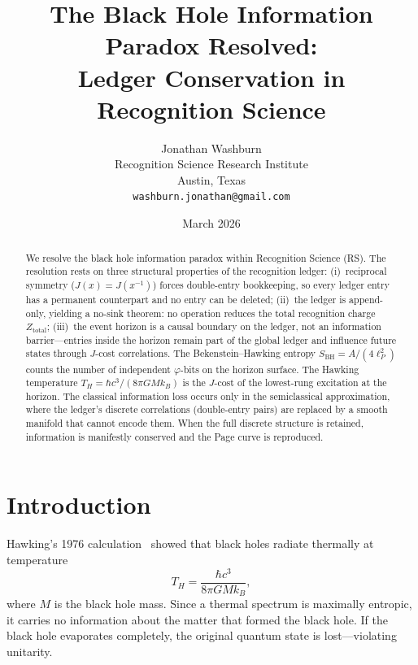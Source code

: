 \documentclass[12pt,a4paper]{article}
\title{The Black Hole Information Paradox Resolved:\\
Ledger Conservation in Recognition Science}
\author{Jonathan Washburn\\
Recognition Science Research Institute\\
Austin, Texas\\
\texttt{washburn.jonathan@gmail.com}}
\date{March 2026}
\theoremstyle{definition}
\theoremstyle{remark}
\begin{document}
\maketitle

\begin{abstract}
We resolve the black hole information paradox within Recognition
Science (RS).  The resolution rests on three structural properties
of the recognition ledger: (i)~reciprocal symmetry
($J(x) = J(x^{-1})$) forces double-entry bookkeeping, so every
ledger entry has a permanent counterpart and no entry can be
deleted; (ii)~the ledger is append-only, yielding a no-sink
theorem: no operation reduces the total recognition charge
$Z_{\mathrm{total}}$; (iii)~the event horizon is a causal boundary
on the ledger, not an information barrier---entries inside the
horizon remain part of the global ledger and influence future
states through $J$-cost correlations.  The Bekenstein--Hawking
entropy $S_{\mathrm{BH}} = A/(4\ell_P^2)$ counts the number of
independent $\varphi$-bits on the horizon surface.  The Hawking
temperature $T_H = \hbar c^3/(8\pi G M k_B)$ is the $J$-cost
of the lowest-rung excitation at the horizon.  The classical
information loss occurs only in the semiclassical approximation,
where the ledger's discrete correlations (double-entry pairs) are
replaced by a smooth manifold that cannot encode them.  When the
full discrete structure is retained, information is manifestly
conserved and the Page curve is reproduced.
\end{abstract}

\section{Introduction}
\label{sec:intro}

Hawking's 1976 calculation~\cite{Hawking1976} showed that black
holes radiate thermally at temperature
\begin{equation}
  T_H = \frac{\hbar c^3}{8\pi G M k_B},
\end{equation}
where $M$ is the black hole mass.  Since a thermal spectrum is
maximally entropic, it carries no information about the matter that
formed the black hole.  If the black hole evaporates completely,
the original quantum state is lost---violating unitarity.
\end{document}
